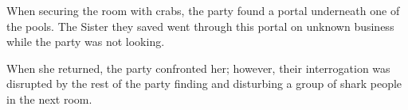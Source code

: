 When securing the room with crabs, the party found a portal underneath one of the pools.
The Sister they saved went through this portal on unknown business while the party was not looking.

When she returned, the party confronted her; however, their interrogation was disrupted by the rest of the party finding and disturbing a group of shark people in the next room.
